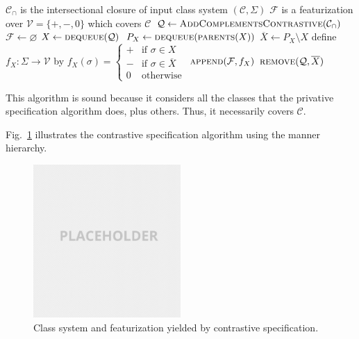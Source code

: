 \documentclass[11pt, oneside]{article}   	%
\begin{document}
\vspace{\baselineskip} \noindent \begin{algorithmic}
    \REQUIRE $\mathcal C_\cap$ is the intersectional closure of input class system $(\mathcal C, \Sigma)$
    \ENSURE $\mathcal F$ is a featurization over $\mathcal V = \{ +, -, 0 \}$ which covers $\mathcal C$
    \STATE
    \STATE $\mathcal Q \leftarrow \textsc{AddComplementsContrastive}(\mathcal{C_\cap})$
    \STATE $\mathcal F \leftarrow \varnothing$
    \STATE
        \STATE $X \leftarrow \textsc{dequeue}(\mathcal Q)$
            \STATE $P_X \leftarrow \textsc{dequeue}(\textsc{parents}(X))$
            \STATE $\overline{X} \leftarrow P_X \setminus X$
            \STATE define $f_X : \Sigma \rightarrow \mathcal V$ by $f_X (\sigma) = \begin{cases}
                    + & \text{if } \sigma \in X \\
                    - & \text{if } \sigma \in \overline{X} \\
                    0 & \text{otherwise}
                    \end{cases}$
            \STATE $\textsc{append}(\mathcal F, f_X)$
            \STATE $\textsc{remove}(\mathcal{Q}, \overline{X})$
        \ENDIF
    \ENDWHILE
\end{algorithmic}

\vspace{\baselineskip} \noindent This algorithm is sound because it considers all the classes that the privative specification algorithm does, plus others. Thus, it necessarily covers $\mathcal C$.

\vspace{\baselineskip} Fig.~\ref{fig:contrastive} illustrates the contrastive specification algorithm using the manner hierarchy.

\begin{figure}[h]
  \centering
  \includegraphics[width=0.5\textwidth]{placeholder.png}
  \caption{Class system and featurization yielded by contrastive specification.}
  \label{fig:contrastive}
\end{figure}
\end{document}
